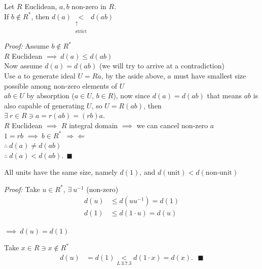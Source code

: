 \begin{lemma}
    Let $R$ Euclidean, $a,b$ non-zero in $R$. \\
    \noindent If $b\not\in R^*$, then $d(a) \underset{\substack{\uparrow \\ \text{strict}}}{<}d(ab)$ \\ \steezybreak
    
    \noindent \textit{Proof:} Assume $b\not\in R^*$ \\
    $R$ Euclidean $\implies \ d(a)\leq d(ab)$ \\
    Now assume $d(a)=d(ab)$ (we will try to arrive at a contradiction) \\
    Use $a$ to generate ideal $U=Ra$, by the aside above, $a$ must have smallest size possible among non-zero elements of $U$ \\
    $ab\in U$ by absorption ($a\in U$, $b\in R$), now since $d(a)=d(ab)$ that means $ab$ is also capable of generating $U$, so $U=R(ab)$, then $\exists \ r\in R \ni a=r(ab)=(rb)a$. \\
    $R$ Euclidean $\implies$ $R$ integral domain $\implies$ we can cancel non-zero $a$ \\
    $1=rb$ $\implies \ b\in R^* \ \ \Rightarrow \Leftarrow$ \\
    $\therefore \ d(a)\neq d(ab)$ \\
    $\therefore \ d(a)<d(ab). \ \ \blacksquare$ 
\end{lemma}
\setcounter{dummy_lemma}{2}
\begin{corollary}
    All units have the same size, namely $d(1)$, and $d(\text{unit})<d(\text{non-unit})$ \\ \steezybreak

    \textit{Proof: }
    Take $u\in R^*$, $\exists \ u^{-1}$ (non-zero) \\
    \begin{align*}
        d(u)&\leq d(uu^{-1})=d(1)\\
        d(1)&\leq d(1\cdot u) = d(u)
    \end{align*}
    
    $\implies \ d(u)=d(1)$ \\ \steezybreak

    Take $x\in R \ni x\not \in R^*$
    \begin{align*}
        d(u)&=d(1) \underset{L \ 3.7.3}{<}d(1\cdot x) = d(x). \ \ \ \blacksquare
    \end{align*}
\end{corollary}

